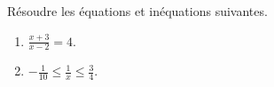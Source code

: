 
\begin{exercice}\label{exosmath-0369}

    Résoudre les équations et inéquations suivantes.
    \begin{enumerate}
        \item
            \( \frac{ x+3 }{ x-2 }=4\).
        \item
            \( -\frac{1}{ 10 }\leq \frac{1}{ x }\leq\frac{ 3 }{ 4 }\).
    \end{enumerate}

\end{exercice}
